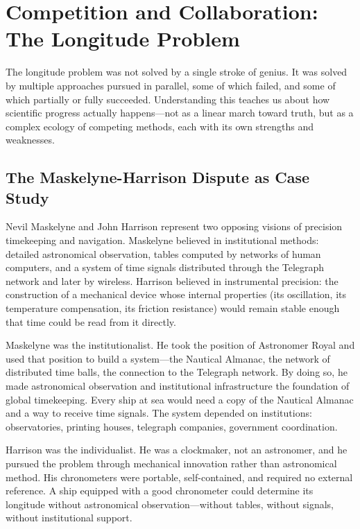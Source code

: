 \section{Competition and Collaboration: The Longitude Problem}

The longitude problem was not solved by a single stroke of genius. It was solved by multiple approaches pursued in parallel, some of which failed, and some of which partially or fully succeeded. Understanding this teaches us about how scientific progress actually happens---not as a linear march toward truth, but as a complex ecology of competing methods, each with its own strengths and weaknesses.

\subsection{The Maskelyne-Harrison Dispute as Case Study}

Nevil Maskelyne and John Harrison represent two opposing visions of precision timekeeping and navigation. Maskelyne believed in institutional methods: detailed astronomical observation, tables computed by networks of human computers, and a system of time signals distributed through the Telegraph network and later by wireless. Harrison believed in instrumental precision: the construction of a mechanical device whose internal properties (its oscillation, its temperature compensation, its friction resistance) would remain stable enough that time could be read from it directly.

Maskelyne was the institutionalist. He took the position of Astronomer Royal and used that position to build a system---the Nautical Almanac, the network of distributed time balls, the connection to the Telegraph network. By doing so, he made astronomical observation and institutional infrastructure the foundation of global timekeeping. Every ship at sea would need a copy of the Nautical Almanac and a way to receive time signals. The system depended on institutions: observatories, printing houses, telegraph companies, government coordination.

Harrison was the individualist. He was a clockmaker, not an astronomer, and he pursued the problem through mechanical innovation rather than astronomical method. His chronometers were portable, self-contained, and required no external reference. A ship equipped with a good chronometer could determine its longitude without astronomical observation---without tables, without signals, without institutional support.

